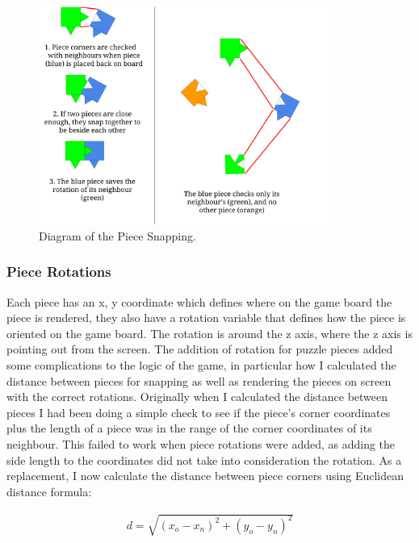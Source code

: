 \documentclass{article}
\begin{document}
\begin{figure}[ht]
\begin{center}
\includegraphics[width=0.85\textwidth, center]{images/PieceSnappingDiagram}
\caption{Diagram of the Piece Snapping.}
\label{fig:PieceSnapping}
\end{center}
\end{figure}

\subsubsection{Piece Rotations}
Each piece has an x, y coordinate which defines where on the game board the
piece is rendered, they also have a rotation variable that defines how the
piece is oriented on the game board. The rotation is around the z axis, where
the z axis is pointing out from the screen. The addition of rotation for puzzle
pieces added some complications to the logic of the game, in particular how I
calculated the distance between pieces for snapping as well as rendering the
pieces on screen with the correct rotations. Originally when I calculated the
distance between pieces I had been doing a simple check to see if the piece's
corner coordinates plus the length of a piece was in the range of the corner
coordinates of its neighbour. This failed to work when piece rotations were
added, as adding the side length to the coordinates did not take into
consideration the rotation. As a replacement, I now calculate the distance
between piece corners using Euclidean distance formula: 

\begin{equation*}
\begin{aligned}
d = \sqrt{(x_o - x_n)^2 + (y_o - y_n)^2}
\end{aligned}
\end{equation*}
\end{document}
